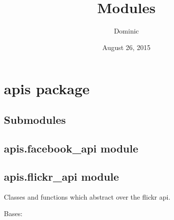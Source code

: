 \documentclass[letterpaper,10pt,english]{sphinxmanual}
\title{Modules}
\date{August 26, 2015}
\author{Dominic}
\begin{document}
\maketitle
\tableofcontents
{}\label{modules::doc}



\chapter{apis package}
\label{apis:apis-package}\label{apis::doc}\label{apis:modules}

\section{Submodules}
\label{apis:submodules}

\section{apis.facebook\_api module}
\label{apis:apis-facebook-api-module}\label{apis:module-apis.facebook_api}

\section{apis.flickr\_api module}
\label{apis:module-apis.flickr_api}\label{apis:apis-flickr-api-module}
Classes and functions which abstract over the flickr api.

\begin{fulllineitems}
\label{apis:apis.flickr_api.FlickrQuery}
Bases: {\hyperref[apis:apis.Query]{\emph{}}}

\end{fulllineitems}

\end{document}
